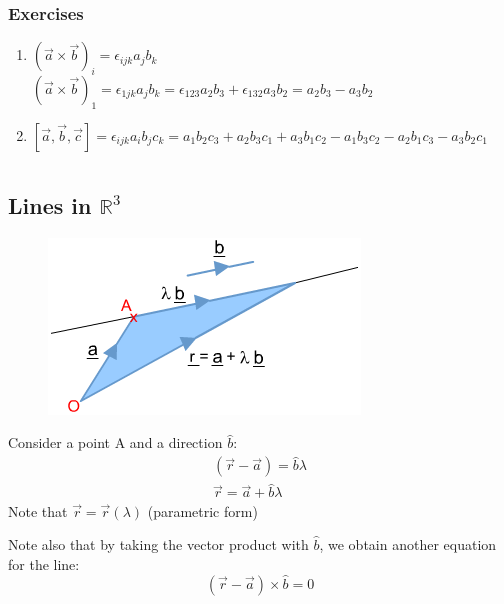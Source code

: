 \documentclass[a4paper, 11pt, normalem]{report}
\newcommand\R{\mathbb{R}}
\begin{document}
\subsection{Exercises}
\begin{enumerate}
    \item $(\vec{a} \times \vec{b})_i = \epsilon_{ijk}a_{j}b_{k}$ \\
          $(\vec{a} \times \vec{b})_1 = \epsilon_{1jk}a_{j}b_{k} = \epsilon_{123}a_{2}b_{3} + \epsilon_{132}a_{3}b_{2} = a_{2}b_{3} - a_{3}b_{2}$
    \item $[\vec{a},\vec{b},\vec{c}] = \epsilon_{ijk}a_{i}b_{j}c_{k} =  a_{1}b_{2}c_{3} + a_{2}b_{3}c_{1} + a_{3}b_{1}c_{2} - a_{1}b_{3}c_{2} - a_{2}b_{1}c_{3} - a_{3}b_{2}c_{1}$
\end{enumerate}

\chapter{}
\section{Lines in $\R^3$}
\begin{figure}
    \begin{center}
        \includegraphics[scale=0.5]{EqLine.png}
    \end{center}
\end{figure}
Consider a point A and a direction $\hat{b}$:
\begin{gather*}
    (\vec{r} - \vec{a}) = \hat{b}\lambda \\
    \vec{r} = \vec{a} + \hat{b}\lambda
\end{gather*}
Note that $\vec{r} =\vec{r}(\lambda)$ (parametric form)

Note also that by taking the vector product with $\hat{b}$, we obtain another equation for the line:
\begin{equation*}
    (\vec{r} - \vec{a}) \times \hat{b} = 0
\end{equation*}
\end{document}
